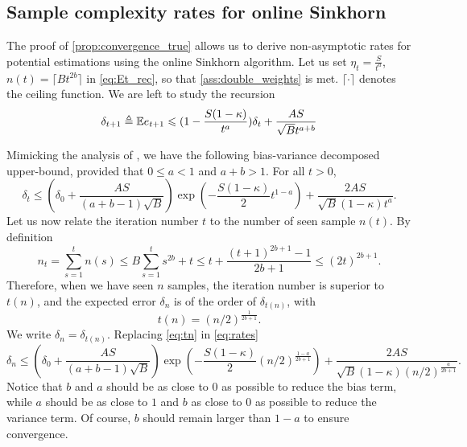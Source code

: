 \subsection{Sample complexity rates for online Sinkhorn}

The proof of \autoref{prop:convergence_true} allows us to derive non-asymptotic rates for potential estimations using the online Sinkhorn algorithm. Let us set $\eta_t = \frac{S}{t^a}$, $n(t) = \lceil B t^{2b} \rceil$ in \eqref{eq:Et_rec}, so that \autoref{ass:double_weights} is met.
$\lceil \cdot \rceil$ denotes the ceiling function.
We are left to study the recursion
\begin{equation}
    \delta_{t+1} \triangleq \mathbb{E} e_{t+1} \leqslant (1 - \frac{S(1 - \kappa)}{t^a}) \delta_t + 
    \frac{A S}{\sqrt{B}{t^{a + b}}}
\end{equation}

Mimicking the analysis of \citet[Theorem 2]{moulines_non-asymptotic_2011}, we have the following
bias-variance decomposed upper-bound,
provided that $0 \leq a < 1$ and $a+ b > 1$. For all $t > 0$,
\begin{equation}\label{eq:rates}
    \delta_t \leq (\delta_0 + \frac{A S}{(a + b - 1)\sqrt{B}})
    \exp(- \frac{S(1 - \kappa)}{2} t^{1 - a})
    + \frac{2 A S}{\sqrt{B}(1 - \kappa) t^a}.
\end{equation}
Let us now relate the iteration number $t$ to the number of seen sample $n(t)$. By definition
\begin{equation}
    n_t = \sum_{s=1}^t n(s) \leq B \sum_{s=1}^t s^{2b} + t \leq
     t + \frac{(t+1)^{2b + 1} - 1}{2b + 1}
     \leq (2t)^{2b+1}.
\end{equation}
Therefore, when we have seen $n$ samples, the iteration number is superior to $t(n)$, and the expected error $\delta_n$ is of the order of $\delta_{t(n)}$, with
\begin{equation}\label{eq:tn}
    t(n) =  {(n/2)}^{\frac{1}{2b + 1}}.
\end{equation}
We write $\delta_n = \delta_{t(n)}$. Replacing \eqref{eq:tn} in \eqref{eq:rates}
\begin{equation}
    \delta_n \leq 
    (\delta_0 + \frac{A S}{(a + b - 1)\sqrt{B}})
    \exp\left(- \frac{S(1 - \kappa)}{2} {(n /2)}^{\frac{1 - a}{2b+1}}\right)
    + \frac{2 A S}{\sqrt{B}(1 - \kappa) {(n/2)}^{\frac{a}{2b+1}}}.
\end{equation}
Notice that $b$ and $a$ should be as close to $0$ as possible to reduce the bias term, while $a$
should be as close to $1$ and $b$ as close to $0$ as possible to reduce the variance
term. Of course, $b$ should remain larger than $1 - a$ to ensure convergence.

